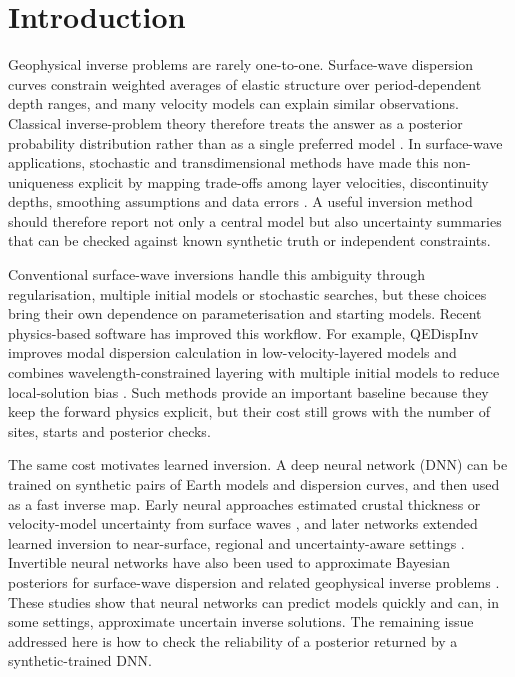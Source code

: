 \documentclass[referee]{gji}
\begin{document}
\section{Introduction}

Geophysical inverse problems are rarely one-to-one. Surface-wave dispersion curves constrain weighted averages of elastic structure over period-dependent depth ranges, and many velocity models can explain similar observations. Classical inverse-problem theory therefore treats the answer as a posterior probability distribution rather than as a single preferred model \citep{MosegaardTarantola1995,Tarantola2005}. In surface-wave applications, stochastic and transdimensional methods have made this non-uniqueness explicit by mapping trade-offs among layer velocities, discontinuity depths, smoothing assumptions and data errors \citep{Sambridge1999,ShapiroRitzwoller2002,BodinEtAl2012,GaoLekic2018}. A useful inversion method should therefore report not only a central model but also uncertainty summaries that can be checked against known synthetic truth or independent constraints.

Conventional surface-wave inversions handle this ambiguity through regularisation, multiple initial models or stochastic searches, but these choices bring their own dependence on parameterisation and starting models. Recent physics-based software has improved this workflow. For example, QEDispInv improves modal dispersion calculation in low-velocity-layered models and combines wavelength-constrained layering with multiple initial models to reduce local-solution bias \citep{PanEtAl2026QEDispInv}. Such methods provide an important baseline because they keep the forward physics explicit, but their cost still grows with the number of sites, starts and posterior checks.

The same cost motivates learned inversion. A deep neural network (DNN) can be trained on synthetic pairs of Earth models and dispersion curves, and then used as a fast inverse map. Early neural approaches estimated crustal thickness or velocity-model uncertainty from surface waves \citep{DevileeEtAl1999,MeierEtAl2007}, and later networks extended learned inversion to near-surface, regional and uncertainty-aware settings \citep{HuEtAl2020,EarpEtAl2020,YablokovEtAl2021,YablokovEtAl2023,KeilWassermann2023,ChenEtAl2022,LuoEtAl2022}. Invertible neural networks have also been used to approximate Bayesian posteriors for surface-wave dispersion and related geophysical inverse problems \citep{ZhangCurtis2021}. These studies show that neural networks can predict models quickly and can, in some settings, approximate uncertain inverse solutions. The remaining issue addressed here is how to check the reliability of a posterior returned by a synthetic-trained DNN.
\end{document}
